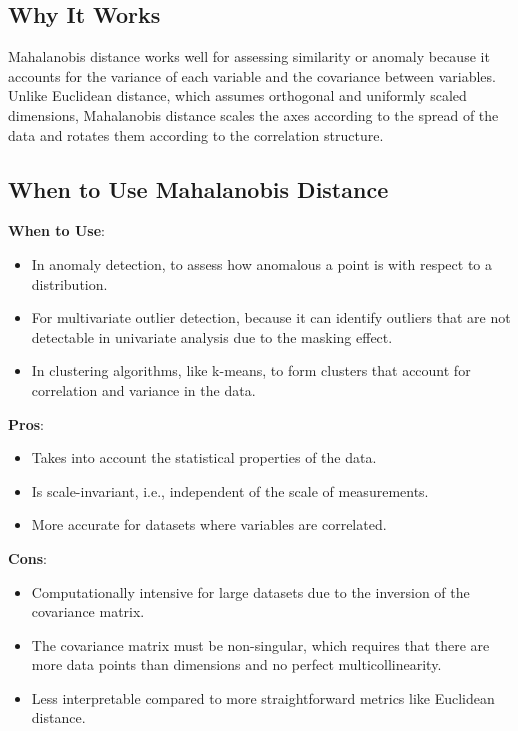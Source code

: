 \documentclass[12pt]{article}
\begin{document}
\subsection{Why It Works}

Mahalanobis distance works well for assessing similarity or anomaly because it accounts for the variance of each variable and the covariance between variables. Unlike Euclidean distance, which assumes orthogonal and uniformly scaled dimensions, Mahalanobis distance scales the axes according to the spread of the data and rotates them according to the correlation structure.

\subsection{When to Use Mahalanobis Distance}

\textbf{When to Use}:
\begin{itemize}
    \item In anomaly detection, to assess how anomalous a point is with respect to a distribution.
    \item For multivariate outlier detection, because it can identify outliers that are not detectable in univariate analysis due to the masking effect.
    \item In clustering algorithms, like k-means, to form clusters that account for correlation and variance in the data.
\end{itemize}

\textbf{Pros}:
\begin{itemize}
    \item Takes into account the statistical properties of the data.
    \item Is scale-invariant, i.e., independent of the scale of measurements.
    \item More accurate for datasets where variables are correlated.
\end{itemize}

\textbf{Cons}:
\begin{itemize}
    \item Computationally intensive for large datasets due to the inversion of the covariance matrix.
    \item The covariance matrix must be non-singular, which requires that there are more data points than dimensions and no perfect multicollinearity.
    \item Less interpretable compared to more straightforward metrics like Euclidean distance.
\end{itemize}
\end{document}
